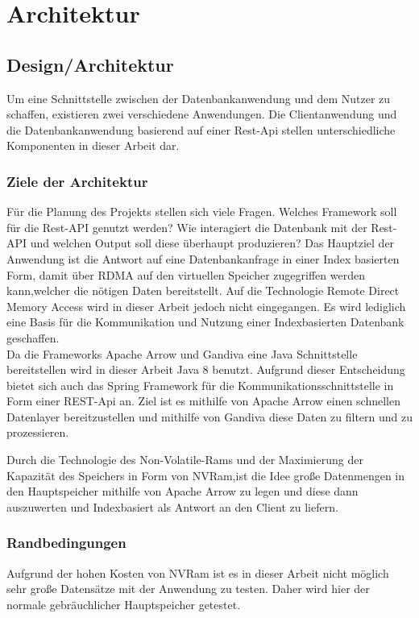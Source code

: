 \chapter{Architektur}
\label{Architektur}

\section{Design/Architektur}
Um eine Schnittstelle zwischen der Datenbankanwendung und dem Nutzer zu schaffen, existieren zwei verschiedene Anwendungen. Die Clientanwendung und die Datenbankanwendung basierend auf einer Rest-Api stellen unterschiedliche Komponenten in dieser Arbeit dar.

\subsection{Ziele der Architektur}

Für die Planung des Projekts stellen sich viele Fragen. Welches Framework soll für die Rest-API genutzt werden? Wie interagiert die Datenbank mit der Rest-API und welchen Output soll diese überhaupt produzieren?
Das Hauptziel der Anwendung ist die Antwort auf eine Datenbankanfrage in einer Index basierten Form, damit über RDMA auf den virtuellen Speicher zugegriffen werden kann,welcher die nötigen Daten bereitstellt.
Auf die Technologie Remote Direct Memory Access wird in dieser Arbeit jedoch nicht eingegangen. Es wird lediglich eine Basis für die Kommunikation und Nutzung einer Indexbasierten Datenbank geschaffen.
\\
Da die Frameworks Apache Arrow und Gandiva eine Java Schnittstelle bereitstellen wird in dieser Arbeit Java 8 benutzt. 
Aufgrund dieser Entscheidung bietet sich auch das Spring Framework für die Kommunikationsschnittstelle in Form einer REST-Api an.
Ziel ist es mithilfe von Apache Arrow einen schnellen Datenlayer bereitzustellen und mithilfe von Gandiva diese Daten zu filtern und zu prozessieren.

Durch die Technologie des Non-Volatile-Rams und der Maximierung der Kapazität des Speichers in Form von NVRam,ist die Idee große Datenmengen in den Hauptspeicher mithilfe von Apache Arrow zu legen und diese dann auszuwerten und Indexbasiert als Antwort an den Client zu liefern.

\subsection{Randbedingungen}
Aufgrund der hohen Kosten von NVRam ist es in dieser Arbeit nicht möglich sehr große Datensätze mit der Anwendung zu testen. Daher wird hier der normale gebräuchlicher Hauptspeicher getestet.

